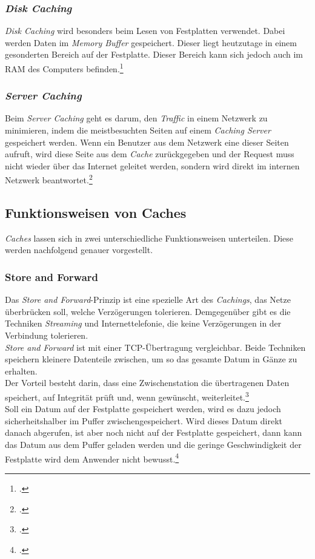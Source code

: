\subsubsection*{\textit{Disk Caching}}
\textit{Disk Caching} wird besonders beim Lesen von Festplatten verwendet. Dabei werden Daten im \textit{Memory Buffer} gespeichert. Dieser liegt heutzutage in einem gesonderten Bereich auf der Festplatte. Dieser Bereich kann sich jedoch auch im \ac{RAM} des Computers befinden.\footcite{Cache-Techtarget-DiskCache}
\subsubsection*{\textit{Server Caching}}
Beim \textit{Server Caching} geht es darum, den \textit{Traffic} in einem Netzwerk zu minimieren, indem die meistbesuchten Seiten auf einem \textit{Caching Server} gespeichert werden. Wenn ein Benutzer aus dem Netzwerk eine dieser Seiten aufruft, wird diese Seite aus dem \textit{Cache} zurückgegeben und der Request muss nicht wieder über das Internet geleitet werden, sondern wird direkt im internen Netzwerk beantwortet.\footcite{Cache-ProxyCache}
\subsection{Funktionsweisen von Caches}
\label{ssec:cache-funktionsweisen}
\textit{Caches} lassen sich in zwei unterschiedliche Funktionsweisen unterteilen. Diese werden nachfolgend genauer vorgestellt.
\subsubsection*{Store and Forward}
\label{sssec:cache-store-forward}
Das \textit{Store and Forward}-Prinzip ist eine spezielle Art des \textit{Cachings}, das Netze überbrücken soll, welche Verzögerungen tolerieren. Demgegenüber gibt es die Techniken \textit{Streaming} und Internettelefonie, die keine Verzögerungen in der Verbindung tolerieren.\\
\textit{Store and Forward} ist mit einer \gls{TCP}-Übertragung vergleichbar. Beide Techniken speichern kleinere Datenteile zwischen, um so das gesamte Datum in Gänze zu erhalten.\\
Der Vorteil besteht darin, dass eine Zwischenstation die übertragenen Daten speichert, auf Integrität prüft und, wenn gewünscht, weiterleitet.\footcite{Cache-StoreForward}\\
Soll ein Datum auf der Festplatte gespeichert werden, wird es dazu jedoch sicherheitshalber im Puffer zwischengespeichert. Wird dieses Datum direkt danach abgerufen, ist aber noch nicht auf der Festplatte gespeichert, dann kann das Datum aus dem Puffer geladen werden und die geringe Geschwindigkeit der Festplatte wird dem Anwender nicht bewusst.\footcite{Cache-StoreForwardSOA}
